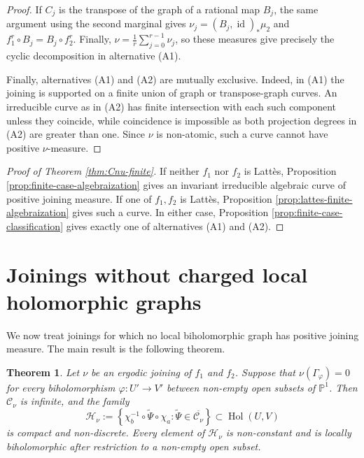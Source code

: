 \documentclass[11pt]{amsart}
\numberwithin{equation}{section}
\theoremstyle{plain}
\newtheorem{thm}{Theorem}[section]
\theoremstyle{definition}
\theoremstyle{remark}
\begin{document}
\begin{proof}
If $C_j$ is the transpose of the graph of a rational map $B_j$, the
same argument using the second marginal gives
$\nu_j=(B_j,\operatorname{id})_*\mu_2$ and
$f_1^r\circ B_j=B_j\circ f_2^r$. Finally,
$\nu=\frac1r\sum_{j=0}^{r-1}\nu_j$, so these measures give precisely
the cyclic decomposition in alternative (A1).

Finally, alternatives \textup{(A1)} and \textup{(A2)} are mutually
exclusive. Indeed, in \textup{(A1)} the joining is supported on a
finite union of graph or transpose-graph curves. An irreducible curve
as in \textup{(A2)} has finite intersection with each such component
unless they coincide, while coincidence is impossible as both
projection degrees in \textup{(A2)} are greater than one. Since
$\nu$ is non-atomic, such a curve cannot have positive $\nu$-measure.
\end{proof}

\begin{proof}[Proof of Theorem \ref{thm:Cnu-finite}]
If neither $f_1$ nor $f_2$ is Latt\`es, Proposition
\ref{prop:finite-case-algebraization} gives an invariant irreducible
algebraic curve of positive joining measure. If one of $f_1,f_2$ is
Latt\`es, Proposition \ref{prop:lattes-finite-algebraization} gives
such a curve. In either case, Proposition
\ref{prop:finite-case-classification} gives exactly one of
alternatives \textup{(A1)} and \textup{(A2)}.
\end{proof}


\section{Joinings without charged local holomorphic graphs}
\label{sec:Cnu-infinite}
We now treat joinings for which no local biholomorphic graph has
positive joining measure. The main result is the following theorem.

\begin{thm}\label{thm:Cnu-infinite}
Let $\nu$ be an ergodic joining of $f_1$ and $f_2$. Suppose that
$\nu(\Gamma_\varphi)=0$ for every biholomorphism
$\varphi\colon U'\to V'$ between non-empty open subsets of
$\mathbb P^1$. Then $\mathcal C_\nu$ is infinite, and
the family
$$
\mathscr H_\nu
:=
\left\{
\chi_b^{-1}
\circ\widetilde\Psi\circ
\chi_a
:
\widetilde\Psi\in\overline{\mathcal C_\nu}
\right\}
\subset\operatorname{Hol}(U,V)
$$
is compact and non-discrete. Every element of $\mathscr H_\nu$ is
non-constant and is locally biholomorphic after restriction to a
non-empty open subset.
\end{thm}
\end{document}
